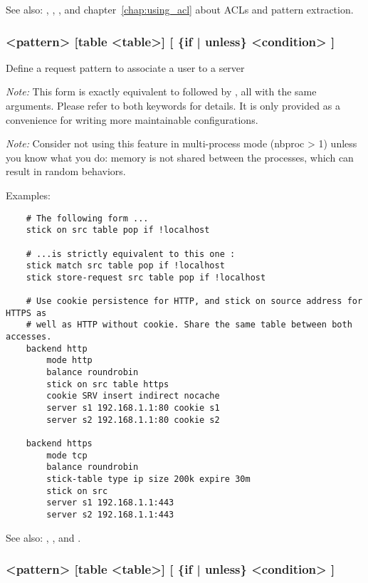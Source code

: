 {  See also: , , ,  and chapter~\ref{chap:using_acl}
             about ACLs and pattern extraction.


\subsubsection[stick on]{ <pattern> [table <table>] [ \{if | unless\} <condition> ]}

  Define a request pattern to associate a user to a server


  \emph{Note:} This form is exactly equivalent to  followed by
         , all with the same arguments. Please refer
         to both keywords for details. It is only provided as a convenience
         for writing more maintainable configurations.

  \emph{Note:} Consider not using this feature in multi-process mode (nbproc > 1)
         unless you know what you do: memory is not shared between the
         processes, which can result in random behaviors.

  Examples:
  \begin{verbatim}
    # The following form ...
    stick on src table pop if !localhost

    # ...is strictly equivalent to this one :
    stick match src table pop if !localhost
    stick store-request src table pop if !localhost

    # Use cookie persistence for HTTP, and stick on source address for HTTPS as
    # well as HTTP without cookie. Share the same table between both accesses.
    backend http
        mode http
        balance roundrobin
        stick on src table https
        cookie SRV insert indirect nocache
        server s1 192.168.1.1:80 cookie s1
        server s2 192.168.1.1:80 cookie s2

    backend https
        mode tcp
        balance roundrobin
        stick-table type ip size 200k expire 30m
        stick on src
        server s1 192.168.1.1:443
        server s2 192.168.1.1:443
   \end{verbatim}

  See also: , ,  and .


\subsubsection[stick store-request]{ <pattern> [table <table>] [ \{if | unless\} <condition> ]}

}

